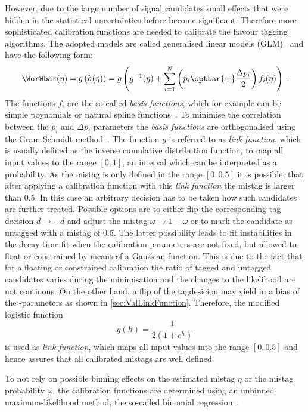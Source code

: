 However, due to the large number of \BdToDpi signal candidates small effects that were hidden in the statistical uncertainties before become significant.
Therefore more sophisticated calibration functions are needed to calibrate the flavour tagging algorithms.
The adopted models are called generalised linear models (GLM)~\cite{GLM} and have the following form:
\begin{equation}
\WorWbar(\eta) = g\left(h(\eta)\right) = g\left( g^{-1} (\eta) + \sum_{i=1}^{N} \left(\tilde{p}_i \kern 0.0em\optbar{\kern -0.0em +} \frac{\Delta p_i}{2}\right) f_i(\eta)\right)\,.
\end{equation}
The functions $f_i$ are the so-called \emph{basis functions}, which for example can be simple poynomials or natural spline functions~\cite{Nsplines}.
To minimise the correlation between the $\tilde{p}_i$ and $\Delta p_i$ parameters the \emph{basis functions} are orthogonalised using the Gram-Schmidt method~\cite{GramSchmidt}.
The function $g$ is referred to as \emph{link function}, which is usually defined as the inverse cumulative distribution function, to map all input values to the range $[0,1]$, \ie an interval which can be interpreted as a probability.
As the mistag is only defined in the range $[0, 0.5]$ it is possible, that after applying a calibration function with this \emph{link function} the mistag is larger than \num{0.5}.
In this case an arbitrary decision has to be taken how such candidates are further treated.
Possible options are to either flip the corresponding tag decision $d\to-d$ and adjust the mistag $\omega\to1-\omega$ or to mark the candidate as untagged with a mistag of \num{0.5}.
The latter possibility leads to fit instabilities in the decay-time fit when the calibration parameters are not fixed, but allowed to float or constrained by means of a Gaussian function.
This is due to the fact that for a floating or constrained calibration the ratio of tagged and untagged candidates varies during the minimisation and the changes to the likelihood are not continous.
On the other hand, a flip of the tagdesicion may yield in a bias of the \CP-parameters as shown in \cref{sec:ValLinkFunction}.
Therefore, the modified logistic function
\begin{equation}
g(h)=\frac{1}{2\left(1+e^h\right)}\label{eq:modlink}
\end{equation}
is used as \emph{link function}, which maps all input values into the range $[0, 0.5]$ and hence assures that all calibrated mistags are well defined.

To not rely on possible binning effects on the estimated mistag $\eta$ or the mistag probability $\omega$, the calibration functions are determined using an unbinned maximum-likelihood method, the so-called binomial regression~\cite{BinRegression}.
